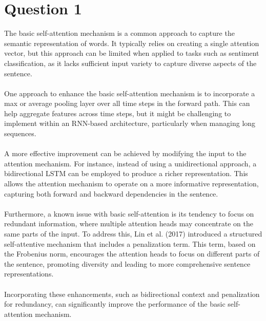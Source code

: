 \documentclass[a4paper]{article}
\begin{document}



\section{Question 1}

\noindent
The basic self-attention mechanism is a common approach to capture the semantic representation
of words. It typically relies on creating a single attention vector, but this approach can be
limited when applied to tasks such as sentiment classification, as it lacks
sufficient input variety to capture diverse aspects of the sentence.
\\
\\
\noindent
One approach to enhance the basic self-attention mechanism is to incorporate a max or
average pooling layer over all time steps in the forward path. This can help aggregate
features across time steps, but it might be challenging to implement within an RNN-based
architecture, particularly when managing long sequences.
\\
\\
\noindent
A more effective improvement can be achieved by modifying the input to the attention mechanism.
For instance, instead of using a unidirectional approach, a bidirectional LSTM can
be employed to produce a richer representation. This allows the attention mechanism to operate on a more informative
representation, capturing both forward and backward dependencies in the sentence.
\\
\\
\noindent
Furthermore, a known issue with basic self-attention is its tendency to focus on redundant
information, where multiple attention heads may concentrate on the same parts of
the input. To address this, Lin et al. (2017) \cite{Lin} introduced a structured self-attentive mechanism that
includes a penalization term. This term, based on the Frobenius norm, encourages the
attention heads to focus on different parts of the sentence, promoting diversity and leading
to more comprehensive sentence representations.
\\
\\
\noindent
Incorporating these enhancements, such as bidirectional context and penalization for
redundancy, can significantly improve the performance of the basic self-attention mechanism.
\end{document}
